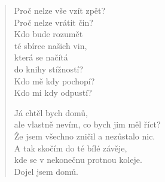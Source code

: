 \begin{multicols}{2}
\begin{verse}
Proč nelze vše vzít zpět?\\
Proč nelze vrátit čin?\\
Kdo bude rozumět\\
té sbírce našich vin,\\
která se načítá\\
do knihy stížností?\\
Kdo mě kdy pochopí?\\
Kdo mi kdy odpustí?

Já chtěl bych domů,\\
ale vlastně nevím, co bych jim měl říct?\\
Že jsem všechno zničil a nezůstalo nic.\\
A tak skočím do té bílé závěje,\\
kde se v nekonečnu protnou koleje.\\
Dojel jsem domů.

\end{verse}

\end{multicols}